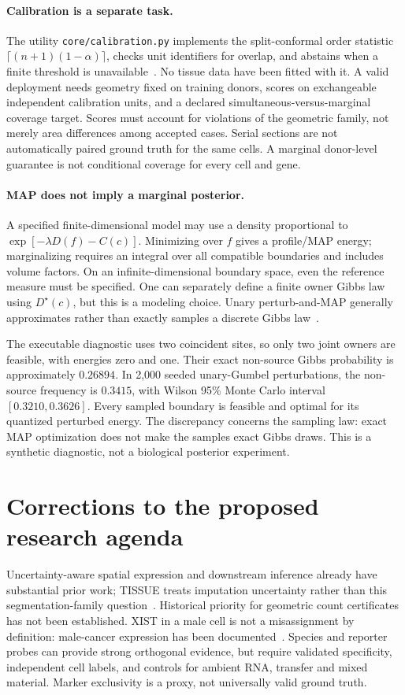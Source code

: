 \documentclass[11pt,letterpaper]{article}
\newcommand{\D}{D^\star}
\begin{document}
\paragraph{Calibration is a separate task.}
The utility \texttt{core/calibration.py} implements the split-conformal order statistic $\lceil(n+1)(1-\alpha)\rceil$, checks unit identifiers for overlap, and abstains when a finite threshold is unavailable~\cite{conformal}. No tissue data have been fitted with it. A valid deployment needs geometry fixed on training donors, scores on exchangeable independent calibration units, and a declared simultaneous-versus-marginal coverage target. Scores must account for violations of the geometric family, not merely area differences among accepted cases. Serial sections are not automatically paired ground truth for the same cells. A marginal donor-level guarantee is not conditional coverage for every cell and gene.

\paragraph{MAP does not imply a marginal posterior.}
A specified finite-dimensional model may use a density proportional to $\exp[-\lambda D(f)-C(c)]$. Minimizing over $f$ gives a profile/MAP energy; marginalizing requires an integral over all compatible boundaries and includes volume factors. On an infinite-dimensional boundary space, even the reference measure must be specified. One can separately define a finite owner Gibbs law using $\D(c)$, but this is a modeling choice. Unary perturb-and-MAP generally approximates rather than exactly samples a discrete Gibbs law~\cite{pm}.

The executable diagnostic uses two coincident sites, so only two joint owners are feasible, with energies zero and one. Their exact non-source Gibbs probability is approximately $0.26894$. In 2,000 seeded unary-Gumbel perturbations, the non-source frequency is $0.3415$, with Wilson 95\% Monte Carlo interval $[0.3210,0.3626]$. Every sampled boundary is feasible and optimal for its quantized perturbed energy. The discrepancy concerns the sampling law: exact MAP optimization does not make the samples exact Gibbs draws. This is a synthetic diagnostic, not a biological posterior experiment.

\section{Corrections to the proposed research agenda}
Uncertainty-aware spatial expression and downstream inference already have substantial prior work; TISSUE treats imputation uncertainty rather than this segmentation-family question~\cite{tissue}. Historical priority for geometric count certificates has not been established. XIST in a male cell is not a misassignment by definition: male-cancer expression has been documented~\cite{xist}. Species and reporter probes can provide strong orthogonal evidence, but require validated specificity, independent cell labels, and controls for ambient RNA, transfer and mixed material. Marker exclusivity is a proxy, not universally valid ground truth.
\end{document}
